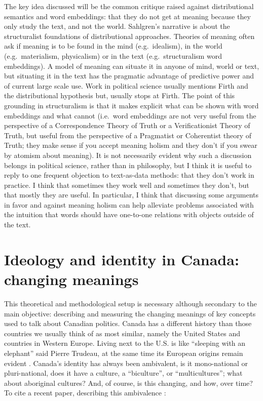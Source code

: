 \documentclass[
  openany]{book}
\begin{document}
The key idea discussed will be the common critique raised against distributional semantics and word embeddings: that they do not get at meaning because they only study the text, and not the world. Sahlgren's narrative is about the structuralist foundations of distributional approaches. Theories of meaning often ask if meaning is to be found in the mind (e.g.~idealism), in the world (e.g.~materialism, physicalism) or in the text (e.g.~structuralism word embeddings). A model of meaning can situate it in anyone of mind, world or text, but situating it in the text has the pragmatic advantage of predictive power and of current large scale use. Work in political science usually mentions Firth and the distributional hypothesis \citep{rheault2020word, rodman2020timely, rodriguez2021word, rodriguez2021embedding} but, usually stops at Firth. The point of this grounding in structuralism is that it makes explicit what can be shown with word embeddings and what cannot (i.e.~word embeddings are not very useful from the perspective of a Correspondence Theory of Truth or a Verificationist Theory of Truth, but useful from the perspective of a Pragmatist or Coherentist theory of Truth; they make sense if you accept meaning holism and they don't if you swear by atomism about meaning). It is not necessarily evident why such a discussion belongs in political science, rather than in philosophy, but I think it is useful to reply to one frequent objection to text-as-data methods: that they don't work in practice. I think that sometimes they work well and sometimes they don't, but that mostly they are useful. In particular, I think that discussing some arguments in favor and against meaning holism can help alleviate problems associated with the intuition that words should have one-to-one relations with objects outside of the text.

\hypertarget{ideology-and-identity-in-canada-changing-meanings}{%
\section{Ideology and identity in Canada: changing meanings}\label{ideology-and-identity-in-canada-changing-meanings}}

This theoretical and methodological setup is necessary although secondary to the main objective: describing and measuring the changing meanings of key concepts used to talk about Canadian politics. Canada has a different history than those countries we usually think of as most similar, namely the United States and countries in Western Europe. Living next to the U.S. is like ``sleeping with an elephant'' said Pierre Trudeau, at the same time its European origins remain evident \citep{resnick2020european}. Canada's identity has always been ambivalent, is it mono-national or pluri-national, does it have a culture, a ``biculture'', or ``multicultures''; what about aboriginal cultures? \citep{wiseman2011search} And, of course, is this changing, and how, over time? To cite a recent paper, describing this ambivalence \citep{dufresne2019symbolic}:
\end{document}
